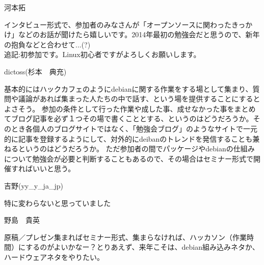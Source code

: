 \begin{prework}{ 河本拓 }

 インタビュー形式で、参加者のみなさんが「オープンソースに関わったきっかけ」などのお話が聞けたら嬉しいです。2014年最初の勉強会だと思うので、新年の抱負などと合わせて...(?)
\\
追記:初参加です。Linux初心者ですがよろしくお願いします。
\end{prework}

\begin{prework}{ dictoss(杉本　典充) }

基本的にはハックカフェのようにdebianに関する作業をする場として集まり、質問や議論があれば集まった人たちの中で話す、という場を提供することにするとよさそう。
参加の条件として行った作業や成した事、成せなかった事をまとめてブログ記事を必ず１つその場で書くこととする、というのはどうだろうか。そのとき各個人のブログサイトではなく、「勉強会ブログ」のようなサイトで一元的に記事を登録するようにして、対外的にdeibanのトレンドを発信することも兼ねるというのはどうだろうか。
ただ参加者の間でパッケージやdebianの仕組みについて勉強会が必要と判断することもあるので、その場合はセミナー形式で開催すればいいと思う。
\end{prework}

\begin{prework}{ 吉野(yy\_{}y\_{}ja\_{}jp) }

特に変わらないと思っていました
\end{prework}

\begin{prework}{ 野島　貴英 }

原稿／プレゼン集まればセミナー形式、集まらなければ、ハッカソン（作業時間）にするのがよいかなー？とりあえず、来年こそは、debian組み込みネタか、ハードウェアネタをやりたい。
\end{prework}
